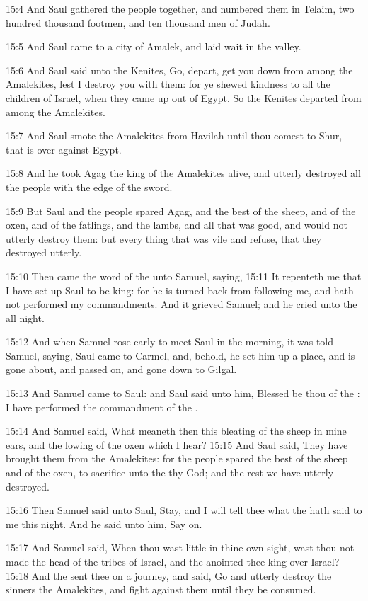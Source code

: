 15:4 And Saul gathered the people together, and numbered them in Telaim, two hundred thousand footmen, and ten thousand men of Judah.

15:5 And Saul came to a city of Amalek, and laid wait in the valley.

15:6 And Saul said unto the Kenites, Go, depart, get you down from among the Amalekites, lest I destroy you with them: for ye shewed kindness to all the children of Israel, when they came up out of Egypt. So the Kenites departed from among the Amalekites.

15:7 And Saul smote the Amalekites from Havilah until thou comest to Shur, that is over against Egypt.

15:8 And he took Agag the king of the Amalekites alive, and utterly destroyed all the people with the edge of the sword.

15:9 But Saul and the people spared Agag, and the best of the sheep, and of the oxen, and of the fatlings, and the lambs, and all that was good, and would not utterly destroy them: but every thing that was vile and refuse, that they destroyed utterly.

15:10 Then came the word of the \LORD unto Samuel, saying, 15:11 It repenteth me that I have set up Saul to be king: for he is turned back from following me, and hath not performed my commandments. And it grieved Samuel; and he cried unto the \LORD all night.

15:12 And when Samuel rose early to meet Saul in the morning, it was told Samuel, saying, Saul came to Carmel, and, behold, he set him up a place, and is gone about, and passed on, and gone down to Gilgal.

15:13 And Samuel came to Saul: and Saul said unto him, Blessed be thou of the \LORD: I have performed the commandment of the \LORD.

15:14 And Samuel said, What meaneth then this bleating of the sheep in mine ears, and the lowing of the oxen which I hear?  15:15 And Saul said, They have brought them from the Amalekites: for the people spared the best of the sheep and of the oxen, to sacrifice unto the \LORD thy God; and the rest we have utterly destroyed.

15:16 Then Samuel said unto Saul, Stay, and I will tell thee what the \LORD hath said to me this night. And he said unto him, Say on.

15:17 And Samuel said, When thou wast little in thine own sight, wast thou not made the head of the tribes of Israel, and the \LORD anointed thee king over Israel?  15:18 And the \LORD sent thee on a journey, and said, Go and utterly destroy the sinners the Amalekites, and fight against them until they be consumed.

